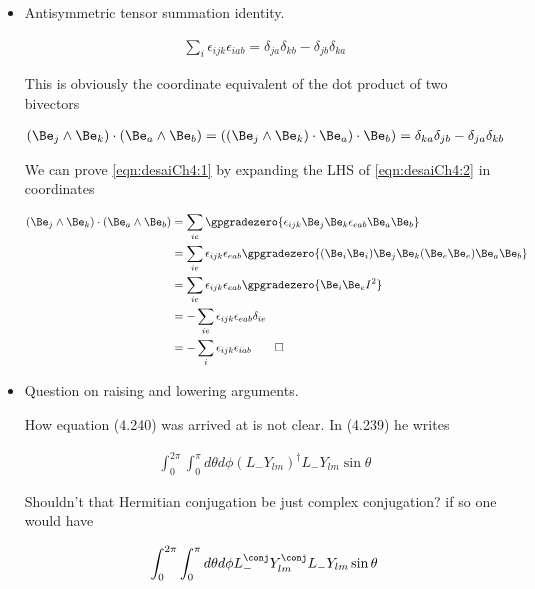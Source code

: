 \begin{itemize}
\item Antisymmetric tensor summation identity.

\begin{align}\label{eqn:desaiCh4:1}
\sum_i \epsilon_{ijk} \epsilon_{iab} = \delta_{ja} \delta_{kb} - \delta_{jb}\delta_{ka}
\end{align}

This is obviously the coordinate equivalent of the dot product of two bivectors

\begin{align}\label{eqn:desaiCh4:2}
(\Be_j \wedge \Be_k) \cdot (\Be_a \wedge \Be_b) &=
( (\Be_j \wedge \Be_k) \cdot \Be_a ) \cdot \Be_b) =
\delta_{ka}\delta_{jb} - \delta_{ja}\delta_{kb}
\end{align}

We can prove \ref{eqn:desaiCh4:1} by expanding the LHS of \ref{eqn:desaiCh4:2} in coordinates

\begin{align*}
(\Be_j \wedge \Be_k) \cdot (\Be_a \wedge \Be_b)
&= \sum_{ie} \gpgradezero{
\epsilon_{ijk} \Be_j \Be_k \epsilon_{eab} \Be_a \Be_b
} \\
&=
\sum_{ie}
\epsilon_{ijk} \epsilon_{eab}
\gpgradezero{
(\Be_i \Be_i) \Be_j \Be_k (\Be_e \Be_e) \Be_a \Be_b
} \\
&=
\sum_{ie}
\epsilon_{ijk} \epsilon_{eab}
\gpgradezero{
\Be_i \Be_e I^2
} \\
&=
-\sum_{ie} \epsilon_{ijk} \epsilon_{eab} \delta_{ie} \\
&=
-
\sum_i
\epsilon_{ijk} \epsilon_{iab}
\qquad\square
\end{align*}

\item Question on raising and lowering arguments.

How equation (4.240) was arrived at is not clear.  In (4.239) he writes

\begin{align*}
\int_0^{2\pi} \int_0^{\pi} d\theta d\phi
(L_{-} Y_{lm})^\dagger
L_{-} Y_{lm} \sin\theta
\end{align*}

Shouldn't that Hermitian conjugation be just complex conjugation? if so one would have

\begin{align*}
\int_0^{2\pi} \int_0^{\pi} d\theta d\phi
L_{-}^\conj Y_{lm}^\conj
L_{-} Y_{lm} \sin\theta
\end{align*}


\end{itemize}

